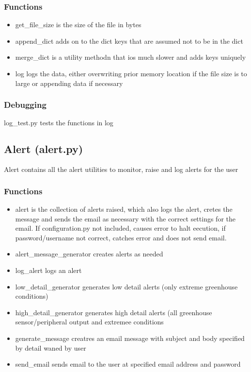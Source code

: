 \documentclass[
]{article}
\providecommand{\tightlist}{%
  \setlength{\itemsep}{0pt}\setlength{\parskip}{0pt}}
\begin{document}
\hypertarget{functions}{%
\subsubsection{Functions}\label{functions}}

\begin{itemize}
\tightlist
\item
  get\_file\_size is the size of the file in bytes
\item
  append\_dict adds on to the dict keys that are assumed not to be in
  the dict
\item
  merge\_dict is a utility methodn that ios much slower and adds keys
  uniquely
\item
  log logs the data, either overwriting prior memory location if the
  file size is to large or appending data if necessary
\end{itemize}

\hypertarget{debugging-1}{%
\subsubsection{Debugging}\label{debugging-1}}

log\_test.py tests the functions in log

\hypertarget{alert-alert.py}{%
\subsection{Alert (alert.py)}\label{alert-alert.py}}

Alert contains all the alert utilities to monitor, raise and log alerts
for the user

\hypertarget{functions-1}{%
\subsubsection{Functions}\label{functions-1}}

\begin{itemize}
\tightlist
\item
  alert is the collection of alerts raised, which also logs the alert,
  cretes the message and sends the email as necessary with the correct
  settings for the email. If configuration.py not included, causes error
  to halt eecution, if password/username not correct, catches error and
  does not send email.
\item
  alert\_message\_generator creates alerts as needed
\item
  log\_alert logs an alert
\item
  low\_detail\_generator generates low detail alerts (only extreme
  greenhouse conditions)
\item
  high\_detail\_generator generates high detail alerts (all greenhouse
  sensor/peripheral output and extremee conditions
\item
  generate\_message creatres an email message with subject and body
  specified by detail waned by user
\item
  send\_email sends email to the user at specified email address and
  password
\end{itemize}
\end{document}
